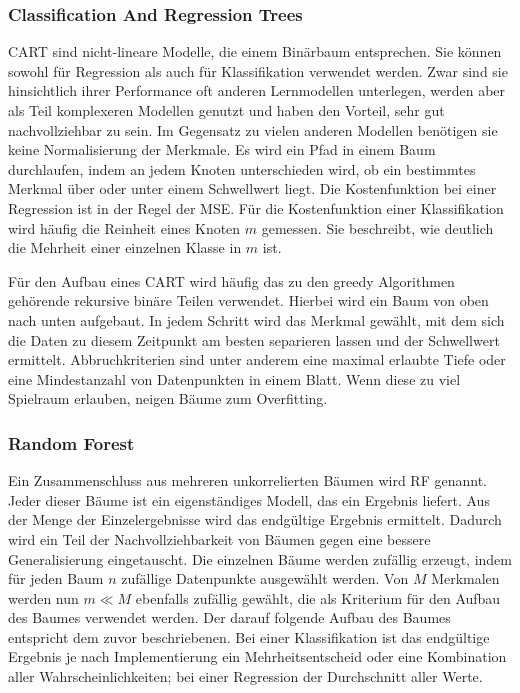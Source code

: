 	
		\subsubsection{Classification And Regression Trees}
		
		\ac{CART} sind nicht-lineare Modelle, die einem Binärbaum entsprechen. Sie können sowohl für Regression als auch für Klassifikation verwendet werden. Zwar sind sie hinsichtlich ihrer Performance oft anderen Lernmodellen unterlegen, werden aber als Teil komplexeren Modellen genutzt und haben den Vorteil, sehr gut nachvollziehbar zu sein. Im Gegensatz zu vielen anderen Modellen benötigen sie keine Normalisierung der Merkmale. Es wird ein Pfad in einem Baum durchlaufen, indem an jedem Knoten unterschieden wird, ob ein bestimmtes Merkmal über oder unter einem Schwellwert liegt. Die Kostenfunktion bei einer Regression ist in der Regel der \ac{MSE}. Für die Kostenfunktion einer Klassifikation wird häufig die \glqq{}Reinheit\grqq{} eines Knoten $m$ gemessen. Sie beschreibt, wie deutlich die Mehrheit einer einzelnen Klasse in $m$ ist.
		
		Für den Aufbau eines \ac{CART} wird häufig das zu den greedy Algorithmen gehörende rekursive binäre Teilen verwendet. Hierbei wird ein Baum von oben nach unten aufgebaut. In jedem Schritt wird das Merkmal gewählt, mit dem sich die Daten zu diesem Zeitpunkt am besten separieren lassen und der Schwellwert ermittelt. Abbruchkriterien sind unter anderem eine maximal erlaubte Tiefe oder eine Mindestanzahl von Datenpunkten in einem Blatt. Wenn diese zu viel Spielraum erlauben, neigen Bäume zum Overfitting.
		
		\subsubsection{Random Forest}
		
		Ein Zusammenschluss aus mehreren unkorrelierten Bäumen wird \ac{RF} genannt. Jeder dieser Bäume ist ein eigenständiges Modell, das ein Ergebnis liefert. Aus der Menge der Einzelergebnisse wird das endgültige Ergebnis ermittelt. Dadurch wird ein Teil der Nachvollziehbarkeit von Bäumen gegen eine bessere Generalisierung eingetauscht. Die einzelnen Bäume werden zufällig erzeugt, indem für jeden Baum $n$ zufällige Datenpunkte ausgewählt werden. Von $M$ Merkmalen werden nun $m \ll M$ ebenfalls zufällig gewählt, die als Kriterium für den Aufbau des Baumes verwendet werden. Der darauf folgende Aufbau des Baumes entspricht dem zuvor beschriebenen. Bei einer Klassifikation ist das endgültige Ergebnis je nach Implementierung ein Mehrheitsentscheid oder eine Kombination aller Wahrscheinlichkeiten; bei einer Regression der Durchschnitt aller Werte.
		
